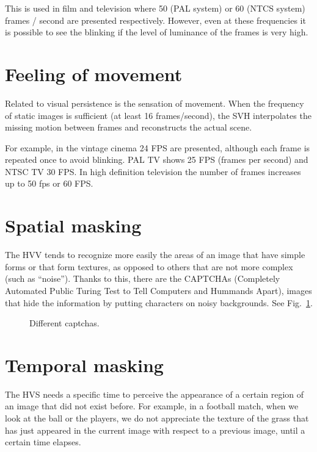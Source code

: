 This is used in film and television where 50 (PAL system) or 60 (NTCS system) frames / second are presented respectively. However, even at these frequencies it is possible to see the blinking if the level of luminance of the frames is very high.

\section{Feeling of movement}

Related to visual persistence is the sensation of movement. When the frequency of static images is sufficient (at least 16 frames/second), the SVH interpolates the missing motion between frames and reconstructs the actual scene.

For example, in the vintage cinema 24 FPS are presented, although each frame is repeated once to avoid blinking. PAL TV shows 25 FPS (frames per second) and NTSC TV 30 FPS. In high definition television the number of frames increases up to 50 fps or 60 FPS.

\section{Spatial masking}

The HVV tends to recognize more easily the areas of an image that have simple forms or that form textures, as opposed to others that are not more complex (such as ``noise''). Thanks to this, there are the CAPTCHAs (Completely Automated Public Turing Test to Tell Computers and Hummands Apart), images that hide the information by putting characters on noisy backgrounds. See Fig.~\ref{fig:cpatcha}.

\begin{figure}
  \caption{Different captchas.} %
  \label{fig:cpatcha}
\end{figure}

\section{Temporal masking}

The HVS needs a specific time to perceive the appearance of a certain region of an image that did not exist before. For example, in a football match, when we look at the ball or the players, we do not appreciate the texture of the grass that has just appeared in the current image with respect to a previous image, until a certain time elapses.

